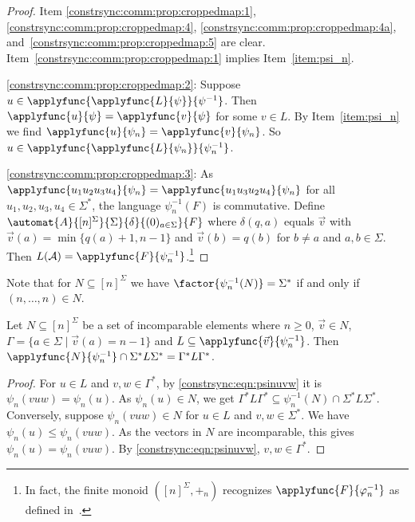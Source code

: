 \begin{proof}
Item \ref{constrsync:comm:prop:croppedmap:1}, \ref{constrsync:comm:prop:croppedmap:4},
\ref{constrsync:comm:prop:croppedmap:4a}, and~\ref{constrsync:comm:prop:croppedmap:5} 
are clear. Item~\ref{constrsync:comm:prop:croppedmap:1} implies Item~\ref{item:psi_n}.

\ref{constrsync:comm:prop:croppedmap:2}: Suppose $u \in \applyfunc{\applyfunc{L}{\psi}}{\psi^{-1}}$.
Then  $\applyfunc{u}{\psi} = \applyfunc{v}{\psi}$
for some $v \in L$.
By Item~\ref{item:psi_n} we find $\applyfunc{u}{\psi_n} = \applyfunc{v}{\psi_n}$.
So $u \in \applyfunc{\applyfunc{L}{\psi_n}}{\psi_n^{-1}}$.

\ref{constrsync:comm:prop:croppedmap:3}:  As $\applyfunc{u_1 u_2 u_3 u_4}{\psi_n} = \applyfunc{u_1 u_3 u_2 u_4}{\psi_n}$
for all $u_1, u_2, u_3, u_4 \in \Sigma^*$, the language $\psi_n^{-1}(F)$ is commutative.  %
Define $\automat{A}{[n]^{\Sigma}}{\Sigma}{\delta}{(0)_{a\in \Sigma}}{F}$
where $\delta(q, a)$ equals $\vec{v}$
with $\vec{v}(a) = \min\{ q(a)+1, n-1 \}$
and $\vec{v}(b) =  q(b)$ for $b \ne a$ and $a,b \in \Sigma$.
Then $L(\mathcal A) = \applyfunc{F}{\psi_n^{-1}}$.\footnote{In fact, the finite monoid $([n]^{\Sigma}, +_n)$
	recognizes $\applyfunc{F}{\varphi_n^{-1}}$ as defined in~\cite{Pin86}.}
\end{proof} 

Note that for $N \subseteq [n]^{\Sigma}$
we have $\factor{\psi_n^{-1}(N)} = \Sigma^*$
if and only if $(n, \ldots, n) \in N$.

\begin{proposition}
\label{constrsync:prop:incomparable}
    Let $N \subseteq [n]^{\Sigma}$ be a set of incomparable elements where $n \ge 0$, $\vec{v} \in N$,
    $\Gamma = \{ a \in \Sigma \mid \vec{v}(a) = n - 1 \}$
    and  $L \subseteq \applyfunc{\vec{v}}{\psi_n^{-1}}$.
    Then $\applyfunc{N}{\psi_n^{-1}} \cap \Sigma^* L \Sigma^* = \Gamma^* L \Gamma^*$.	
\end{proposition}
\begin{proof}
	For $u \in L$ and $v,w \in \Gamma^*$,
	by \cref{constrsync:eqn:psinuvw} it is $\psi_n(vuw) = \psi_n(u)$.
	As $\psi_n(u) \in N$,
	we get $\Gamma^* L \Gamma^* \subseteq \psi_n^{-1}(N) \cap \Sigma^* L \Sigma^*$.
	Conversely, suppose $\psi_n(vuw) \in N$ for $u \in L$ and $v,w \in \Sigma^*$.
	We have $\psi_n(u) \le \psi_n(vuw)$.
	As the vectors in $N$
	are incomparable, this gives $\psi_n(u) = \psi_n(vuw)$.
	By \cref{constrsync:eqn:psinuvw}, $v,w \in \Gamma^*$.
\end{proof}

